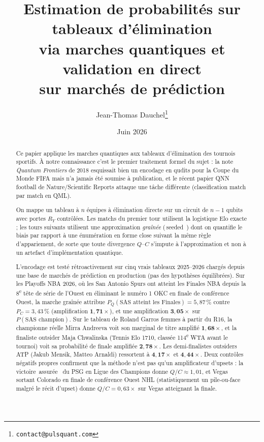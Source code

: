 \documentclass[11pt]{article}
\title{Estimation de probabilités sur tableaux d'élimination\\
via marches quantiques et validation en direct\\
sur marchés de prédiction}
\author{Jean-Thomas Dauchel\thanks{\texttt{contact@pulsquant.com}}}
\affil{PulsQuant --- Recherche indépendante}
\date{Juin 2026}
\providecommand{\og}{\guillemotleft\,}
\providecommand{\fg}{\,\guillemotright}
\begin{document}
\maketitle

\begin{abstract}
Ce papier applique les marches quantiques aux tableaux d'élimination
des tournois sportifs. À notre connaissance c'est le premier
traitement formel du sujet : la note \emph{Quantum Frontiers} de 2018
\cite{quantumfrontiers_wc_2018} esquissait bien un encodage en qudits
pour la Coupe du Monde FIFA mais n'a jamais été soumise à publication,
et le récent papier QNN football de Nature/Scientific Reports
\cite{nature_qnn_football_2025} attaque une tâche différente
(classification match par match en QML).

On mappe un tableau à $n$ équipes à élimination directe sur un circuit
de $n{-}1$ qubits avec portes $R_Y$ contrôlées. Les matchs du premier
tour utilisent la logistique Elo exacte ; les tours suivants utilisent
une approximation \emph{graînée} (\og seeded \fg{}) dont on quantifie
le biais par rapport à une énumération en forme close suivant la même
règle d'appariement, de sorte que toute divergence $Q$--$C$ s'impute à
l'approximation et non à un artefact d'implémentation quantique.

L'encodage est testé rétroactivement sur cinq vrais tableaux
2025--2026 chargés depuis une base de marchés de prédiction en
production (pas des hypothèses équilibrées). Sur les Playoffs NBA
2026, où les San Antonio Spurs ont atteint les Finales NBA depuis la
8\textsuperscript{e} tête de série de l'Ouest en éliminant le numéro 1
OKC en finale de conférence Ouest, la marche graînée attribue
$P_Q(\text{SAS atteint les Finales}) = 5{,}87\,\%$ contre
$P_C = 3{,}43\,\%$ (amplification $\mathbf{1{,}71\times}$), et une
amplification $\mathbf{3{,}05\times}$ sur $P(\text{SAS champion})$.
Sur le tableau de Roland Garros femmes à partir du R16, la championne
réelle Mirra Andreeva voit son marginal de titre amplifié
$\mathbf{1{,}68\times}$, et la finaliste outsider Maja Chwalinska
(Tennis Elo 1710, classée 114\textsuperscript{e} WTA avant le tournoi)
voit sa probabilité de finale amplifiée $\mathbf{2{,}78\times}$. Les
demi-finalistes outsiders ATP (Jakub Mensik, Matteo Arnaldi)
ressortent à $\mathbf{4{,}17\times}$ et $\mathbf{4{,}44\times}$. Deux
contrôles négatifs propres confirment que la méthode n'est pas qu'un
amplificateur d'upsets : la victoire \og assurée \fg{} du PSG en
Ligue des Champions donne $Q/C \approx 1{,}01$, et Vegas sortant
Colorado en finale de conférence Ouest NHL (statistiquement un
pile-ou-face malgré le récit d'upset) donne $Q/C = 0{,}63\times$ sur
Vegas atteignant la finale.


\end{abstract}
\end{document}
